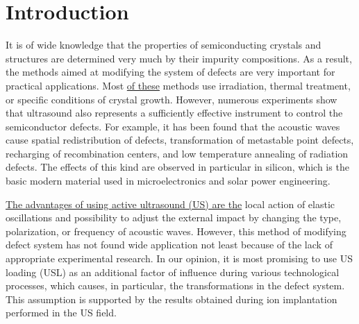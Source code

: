 \documentclass[%
 aip,jap,
 amsmath,amssymb,
 reprint,%
]{revtex4-1}
\begin{document}
\maketitle


\section{\label{sec:Int}Introduction}

It is of wide knowledge that the properties of semiconducting crystals and structures are determined very much by their impurity compositions.
As a result, the methods aimed at modifying the system of defects are very important for practical applications.
Most \textcolor[rgb]{0.00,0.07,1.00}{\uline{of these}} methods use irradiation, thermal treatment, or specific conditions of crystal growth.
However, numerous experiments show that ultrasound also represents a sufficiently effective instrument to control the semiconductor defects.
For example, it has been found that the acoustic waves cause
spatial redistribution of defects,\cite{Roman:2010JAP,GORB2020,Ostapenko1999,Zaveryukhin2002,Zaver:2008,OstapSC}
transformation of metastable point defects,\cite{buyanova1994,Ostrovskii2001,Wosinski}
recharging of recombination centers,\cite{Olikh:Ultras,Korotchenkov1995}
and low temperature annealing of radiation defects.\cite{Podolian2012,YOlikh2006TPL,UST:OstrovCsI,Parchinskii2006,UST:LED_SM}
The effects of this kind are observed in particular in silicon, which is the basic modern material used in microelectronics and solar power engineering. \cite{Roman:2010JAP,GORB2020,Zaver:2008,Roman:2007APL,OlikhJAP,Ostrovskii2001,Podolian2012,Parchinskii2006}


\textcolor[rgb]{0.00,0.07,1.00}{\uline{
The advantages of using active ultrasound (US) are the}}
local action of elastic oscillations
and possibility to adjust the external impact by changing the type, polarization, or frequency of acoustic waves.\cite{Olikh2018JAP}
However, this method of modifying defect system has not found wide application not least because of the lack of appropriate experimental research.
In our opinion, it is most promising to use US loading (USL) as an additional factor of influence during various technological processes, which causes, in particular, the transformations in the defect system.
This assumption is supported by the results obtained during ion implantation performed in the US field.\cite{Roman:2010JAP,Roman:2007APL,Roman:2006JAP}
\end{document}
